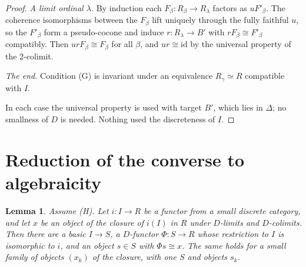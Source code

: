 \documentclass[11pt,a4paper]{amsart}
\newtheorem{lemma}[theorem]{Lemma}
\theoremstyle{definition}
\theoremstyle{remark}
\begin{document}
\begin{proof}
\emph{A limit ordinal $\lambda$.} By induction each $F_\beta\colon R_\beta\to R_\lambda$ factors as $uF'_\beta$. The coherence isomorphisms between the $F_\beta$ lift uniquely through the fully faithful $u$, so the $F'_\beta$ form a pseudo-cocone and induce $r\colon R_\lambda\to B'$ with $rF_\beta\cong F'_\beta$ compatibly. Then $urF_\beta\cong F_\beta$ for all $\beta$, and $ur\cong\mathrm{id}$ by the universal property of the 2-colimit.

\emph{The end.} Condition (G) is invariant under an equivalence $R_\gamma\simeq R$ compatible with $I$.

In each case the universal property is used with target $B'$, which lies in $\Delta$; no smallness of $D$ is needed. Nothing used the discreteness of $I$.
\end{proof}

\section{Reduction of the converse to algebraicity}\label{sec:reduction}

\begin{lemma}\label{l:closure}
Assume (H). Let $i\colon I\to R$ be a functor from a small discrete category, and let $x$ be an object of the closure of $i(I)$ in $R$ under $D$-limits and $D$-colimits. Then there are a basic $I\to S$, a $D$-functor $\Phi\colon S\to R$ whose restriction to $I$ is isomorphic to $i$, and an object $s\in S$ with $\Phi s\cong x$. The same holds for a small family of objects $(x_k)$ of the closure, with one $S$ and objects $s_k$.
\end{lemma}
\end{document}
